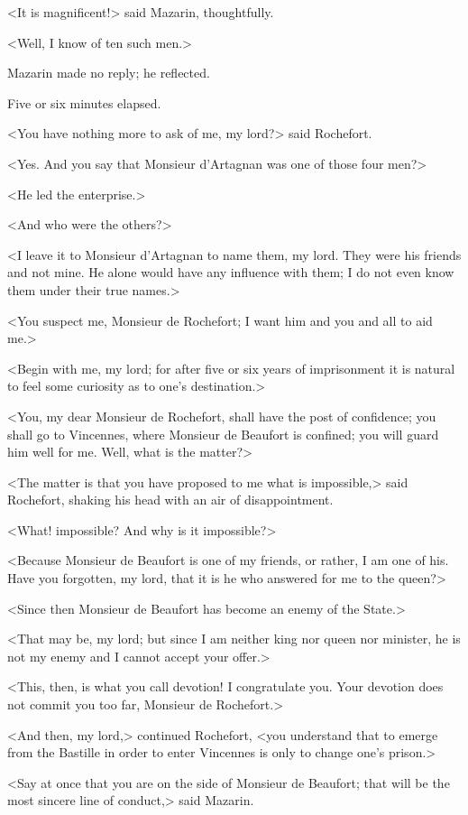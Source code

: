 <It is magnificent!> said Mazarin, thoughtfully.

<Well, I know of ten such men.>

Mazarin made no reply; he reflected.

Five or six minutes elapsed.

<You have nothing more to ask of me, my lord?> said Rochefort.

<Yes. And you say that Monsieur d'Artagnan was one of those four men?>

<He led the enterprise.>

<And who were the others?>

<I leave it to Monsieur d'Artagnan to name them, my lord. They were his friends and not mine. He alone would have any influence with them; I do not even know them under their true names.>

<You suspect me, Monsieur de Rochefort; I want him and you and all to aid me.>

<Begin with me, my lord; for after five or six years of imprisonment it is natural to feel some curiosity as to one's destination.>

<You, my dear Monsieur de Rochefort, shall have the post of confidence; you shall go to Vincennes, where Monsieur de Beaufort is confined; you will guard him well for me. Well, what is the matter?>

<The matter is that you have proposed to me what is impossible,> said Rochefort, shaking his head with an air of disappointment.

<What! impossible? And why is it impossible?>

<Because Monsieur de Beaufort is one of my friends, or rather, I am one of his. Have you forgotten, my lord, that it is he who answered for me to the queen?>

<Since then Monsieur de Beaufort has become an enemy of the State.>

<That may be, my lord; but since I am neither king nor queen nor minister, he is not my enemy and I cannot accept your offer.>

<This, then, is what you call devotion! I congratulate you. Your devotion does not commit you too far, Monsieur de Rochefort.>

<And then, my lord,> continued Rochefort, <you understand that to emerge from the Bastille in order to enter Vincennes is only to change one's prison.>

<Say at once that you are on the side of Monsieur de Beaufort; that will be the most sincere line of conduct,> said Mazarin.

